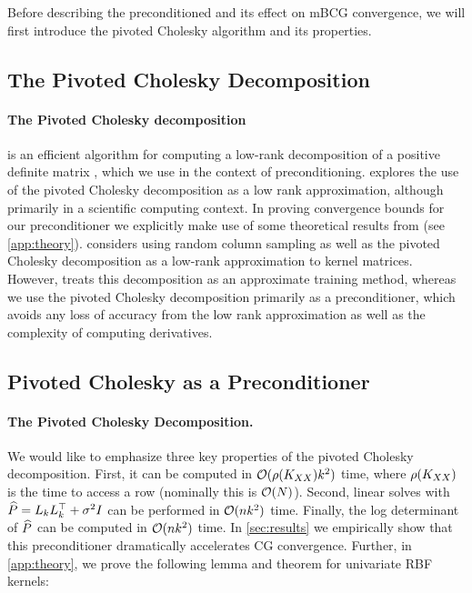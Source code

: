 Before describing the preconditioned and its effect on mBCG convergence, we will first introduce the pivoted Cholesky algorithm and its properties.


\subsection{The Pivoted Cholesky Decomposition}

\paragraph{The Pivoted Cholesky decomposition}
is an efficient algorithm for computing a low-rank decomposition of a positive definite matrix \cite{harbrecht2012low,bach2013sharp}, which we use in the context of preconditioning.
\citet{harbrecht2012low} explores the use of the pivoted Cholesky decomposition as a low rank approximation, although primarily in a scientific computing context.
In proving convergence bounds for our preconditioner we explicitly make use of some theoretical results from \cite{harbrecht2012low} (see \cref{app:theory}).
\citet{bach2013sharp} considers using random column sampling as well as the pivoted Cholesky decomposition as a low-rank approximation to kernel matrices.
However, \citet{bach2013sharp} treats this decomposition as an approximate training method, whereas we use the pivoted Cholesky decomposition primarily
as a preconditioner, which avoids any loss of accuracy from the low rank approximation as well as the complexity of computing derivatives.

\subsection{Pivoted Cholesky as a Preconditioner}

\paragraph{The Pivoted Cholesky Decomposition.}

We would like to emphasize three key properties of the pivoted Cholesky decomposition.
First, it can be computed in $\bigo{\row{\bK_{\bX\bX}}k^{2}}$ time, where $\rho ( K_{XX} )$ is the time to access a row (nominally this is $\bigo{N}$).
Second, linear solves with $\widehat{P} = L_{k}L_{k}^{\top} + \sigma^{2}I$ can be performed in $\bigo{nk^{2}}$ time. Finally, the log determinant of $\widehat{P}$ can be computed in $\bigo{nk^{2}}$ time.
In \cref{sec:results} we empirically show that this preconditioner dramatically accelerates CG convergence.
Further, in \cref{app:theory}, we prove the following lemma and theorem for univariate RBF kernels:

